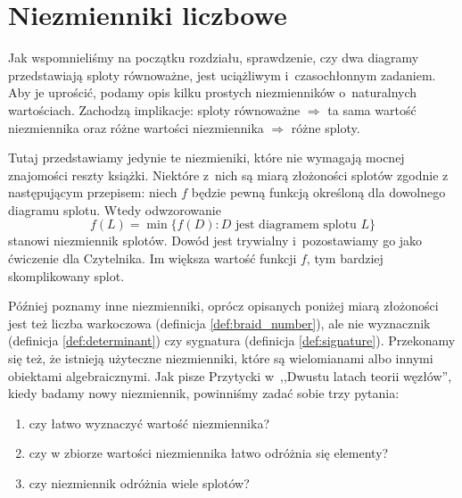 
\section{Niezmienniki liczbowe}
Jak wspomnieliśmy na początku rozdziału, sprawdzenie, czy dwa diagramy przedstawiają sploty równoważne, jest uciążliwym i~czasochłonnym zadaniem.
Aby je uprościć, podamy opis kilku prostych niezmienników o~naturalnych wartościach.
Zachodzą implikacje:
sploty równoważne $\Rightarrow$ ta sama wartość niezmiennika
oraz różne wartości niezmiennika $\Rightarrow$ różne sploty.

Tutaj przedstawiamy jedynie te niezmieniki, które nie wymagają mocnej znajomości reszty książki.
Niektóre z~nich są miarą złożoności splotów zgodnie z następującym przepisem: niech $f$ będzie pewną funkcją określoną dla dowolnego diagramu splotu.
Wtedy odwzorowanie
\begin{equation}
    f(L) = \min \{f(D) : D \text{ jest diagramem splotu } L\}
\end{equation}
stanowi niezmiennik splotów.
Dowód jest trywialny i~pozostawiamy go jako ćwiczenie dla Czytelnika.
Im większa wartość funkcji $f$, tym bardziej skomplikowany splot.

Później poznamy inne niezmienniki, oprócz opisanych poniżej miarą złożoności jest też liczba warkoczowa (definicja \ref{def:braid_number}), ale nie wyznacznik (definicja \ref{def:determinant}) czy sygnatura (definicja \ref{def:signature}).
Przekonamy się też, że istnieją użyteczne niezmienniki, które są wielomianami albo innymi obiektami algebraicznymi.
Jak pisze Przytycki w~,,Dwustu latach teorii węzłów'', kiedy badamy nowy niezmiennik, powinniśmy zadać sobie trzy pytania:
\begin{enumerate}
    \item czy łatwo wyznaczyć wartość niezmiennika?
    \item czy w zbiorze wartości niezmiennika łatwo odróżnia się elementy?
    \item czy niezmiennik odróżnia wiele splotów?
\end{enumerate}













